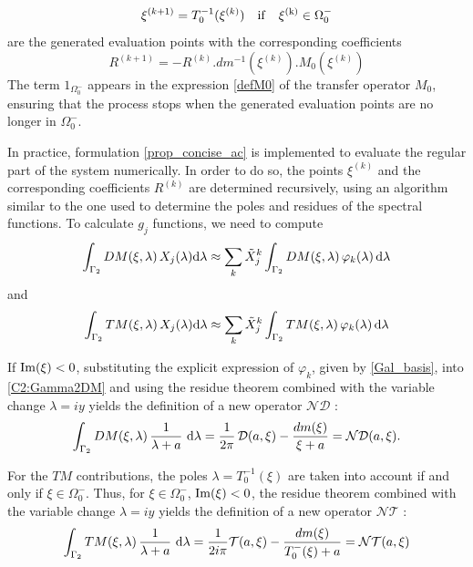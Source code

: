 \begin{equation}
\xi^{(k+1)}=T_0^{-1}(\xi^{(k)}) \quad \rm if \quad \xi^{(k)} \in \Omega_0^-
\end{equation}
are the generated evaluation points with the corresponding coefficients 
\begin{equation}
R^{(k+1)}=-R^{(k)}.dm^{-1}(\xi^{(k)}).M_0(\xi^{(k)})
\end{equation}
The term $1_{\Omega_0^-}$ appears in the expression \eqref{defM0} of the transfer operator $M_0$, ensuring that the process stops when the generated evaluation points are no longer in $\Omega_0^-$.

In practice, formulation \eqref{prop_concise_ac} is implemented to evaluate the regular part of the system numerically. In order to do so, the points $\xi^{(k)}$  and the corresponding coefficients $R^{(k)}$ are determined recursively, using an algorithm similar to the one used to determine the poles and residues of the spectral functions. To calculate $g_j$ functions, we need to compute
\begin{equation}
\int_{\Gamma_2} DM(\xi,\lambda) \, X_j(\lambda) {\rm d} \lambda \approx \sum_k \tilde{X}_j^k \int_{\Gamma_2} DM(\xi,\lambda) \, \varphi_k(\lambda) \, {\rm d} \lambda 
\label{C2:Gamma2DM}
\end{equation}
and
\begin{equation}
\int_{\Gamma_2} TM(\xi,\lambda) \, X_j(\lambda) {\rm d} \lambda \approx \sum_k \tilde{X}_j^k \int_{\Gamma_2} TM(\xi,\lambda) \, \varphi_k(\lambda) \, {\rm d} \lambda
\label{C2:Gamma2TM}
\end{equation}

If ${\rm Im}(\xi) < 0$, substituting the explicit expression of $\varphi_k$, given by \eqref{Gal_basis}, into \eqref{C2:Gamma2DM} and using the residue theorem combined with the variable change $\lambda = iy$ yields the definition of a new operator $\mathcal{ND}$ :
\begin{equation}
\int_{\Gamma_2} DM(\xi,\lambda) \,  \dfrac{1}{\lambda+a} \, \, {\rm d} \lambda =  \dfrac{1}{2\pi} \, \mathcal{D}(a,\xi) - \dfrac{dm(\xi)}{\xi +a} = \mathcal{ND}(a,\xi). 
\end{equation}

For the $TM$ contributions, the poles $\lambda = T_0^{-1}(\xi)$ are taken into account if and only if $\xi \in \Omega_0^-$. Thus, for $\xi \in \Omega_0^-$, ${\rm Im}(\xi) < 0$, the residue theorem combined with the variable change $\lambda = iy$ yields the definition of a new operator $\mathcal{NT}$ :
\begin{equation}
\int_{\Gamma_2} TM(\xi,\lambda) \,  \dfrac{1}{\lambda +a} \, \, {\rm d} \lambda = \frac{1}{2i\pi} \mathcal{T}(a,\xi)- \dfrac{dm(\xi)}{T_0^-(\xi) +a}   =  \mathcal{NT}(a,\xi)
\end{equation}

